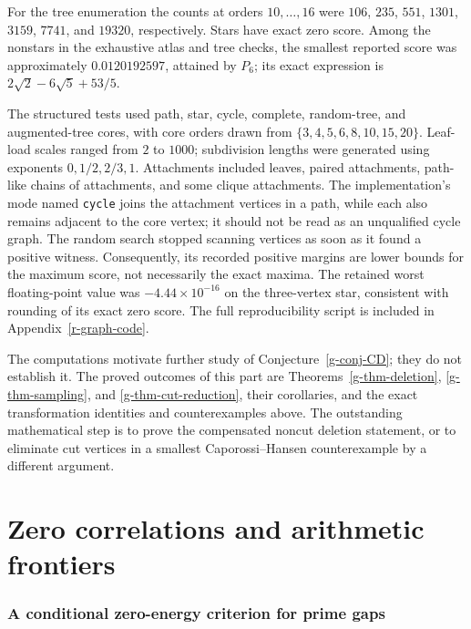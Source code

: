 \documentclass[11pt,a4paper]{article}
\theoremstyle{definition}
\theoremstyle{remark}
\begin{document}
For the tree enumeration the counts at orders $10,\ldots,16$ were
$106$, $235$, $551$, $1301$, $3159$, $7741$, and $19320$, respectively.  Stars have exact zero
score.  Among the nonstars in the exhaustive atlas and tree checks, the
smallest reported score was approximately $0.0120192597$, attained by
$P_6$; its exact expression is
$2\sqrt2-6\sqrt5+53/5$.

The structured tests used path, star, cycle, complete, random-tree, and
augmented-tree cores, with core orders drawn from
$\{3,4,5,6,8,10,15,20\}$.  Leaf-load scales ranged from $2$ to $1000$;
subdivision lengths were generated using exponents $0,1/2,2/3,1$.
Attachments included leaves, paired attachments, path-like chains of
attachments, and some clique attachments.  The implementation's mode
named \texttt{cycle} joins the attachment vertices in a path, while each
also remains adjacent to the core vertex; it should not be read as an
unqualified cycle graph.  The random search stopped scanning vertices
as soon as it found a positive witness.  Consequently, its recorded
positive margins are lower bounds for the maximum score, not necessarily
the exact maxima.  The retained worst floating-point value was
$-4.44\times10^{-16}$ on the three-vertex star, consistent with rounding
of its exact zero score.  The full reproducibility script is included in
Appendix~\ref{r-graph-code}.

The computations motivate further study of
Conjecture~\ref{g-conj-CD}; they do not establish it.  The proved outcomes
of this part are Theorems~\ref{g-thm-deletion}, \ref{g-thm-sampling}, and
\ref{g-thm-cut-reduction}, their corollaries, and the exact transformation
identities and counterexamples above.  The outstanding mathematical step
is to prove the compensated noncut deletion statement, or to eliminate
cut vertices in a smallest Caporossi--Hansen counterexample by a different
argument.

\clearpage
\part{Zero correlations and arithmetic frontiers}\label{r-part-frontier}

\providecommand{\fCl}{\operatorname{Cl}}
\providecommand{\fden}{\operatorname{den}}

\section{A conditional zero-energy criterion for prime gaps}
\label{f-sec-zero-energy}
\end{document}
